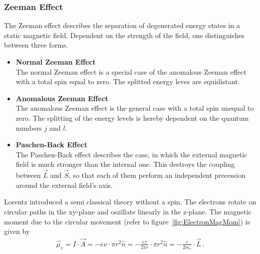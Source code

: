 \subsubsection{Zeeman Effect}
\label{toc:ZeemanEffect}
The Zeeman effect describes the separation of degenerated energy states in a static magnetic field. 
Dependent on the strength of the field, one distinguishes between three forms.
\begin{itemize}
	\item \textbf{Normal Zeeman Effect}\\
	The normal Zeeman effect is a special case of the anomalous Zeeman effect with a total spin equal to zero. The splitted energy leves are equidistant.
	\item \textbf{Anomalous Zeeman Effect}\\
	The anomalous Zeeman effect is the general case with a total spin unequal to zero. The splitting of the energy levels is hereby dependent on the quantum numbers $j$ and $l$.
	\item \textbf{Paschen-Back Effect}\\
	The Paschen-Back effect describes the case, in which the external magnetic field is much stronger than the internal one. 
This destroys the coupling between $\vec{L}$ and $\vec{S}$, so that each of them perform an independent precession around the external field's axis.
\end{itemize}
Lorentz introduced a semi classical theory without a spin.  
The electrons rotate on circular paths in the xy-plane and oszillate linearly in the z-plane. 
The magnetic moment due to the circular movement (refer to figure~\ref{fig:ElectronMagMom}) is given by
	\begin{align}
		\vec{\mu}_e = I\cdot \vec{A} = -e\nu \cdot \pi r^2 \hat{n} = -\frac{ev}{2\pi r}\cdot \pi r^2 \hat{n} = -\frac{e}{2m_e}\cdot \vec{L}\ .
	\end{align}

